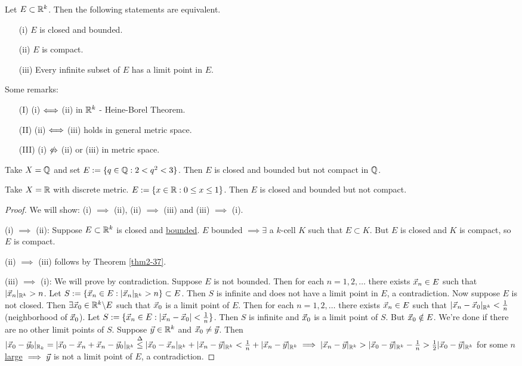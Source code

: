 \documentclass[]{article}
\begin{document}
\begin{theorem}
	Let \ul{$E\subset\mathbb{R}^k$}. Then the following statements are equivalent.
	\begin{enumerate}
		\item[(i)] $E$ is closed and bounded.
		\item[(ii)] $E$ is compact.
		\item[(iii)] Every infinite subset of $E$ has a limit point in $E$.
	\end{enumerate}
\end{theorem}
\begin{remark}
	Some remarks:
	\begin{enumerate}
		\item[(I)] (i) $\Longleftrightarrow$ (ii) in $\mathbb{R}^k$ - Heine-Borel Theorem.
		\item[(II)] (ii) $\Longleftrightarrow$ (iii) holds in general metric space.
		\item[(III)] (i) $\not\Leftrightarrow$ (ii) or (iii) in metric space.
	\end{enumerate}
\end{remark}
\begin{example}
	Take $X = \mathbb{Q}$ and set $E:=\{q\in\mathbb{Q}: 2<q^2<3\}$.
	Then $E$ is closed and bounded but not compact in $\mathbb{Q}$.
\end{example}
\begin{example}
	Take $X = \mathbb{R}$ with discrete metric.
	$E := \{x\in\mathbb{R} : 0\leq x\leq 1\}$. Then $E$ is closed and bounded but not compact.
\end{example}
\begin{proof}
	We will show: (i) $\implies$ (ii), (ii) $\implies$ (iii) and (iii) $\implies$ (i).

	(i) $\implies$ (ii): Suppose $E\subset\mathbb{R}^k$ is closed and \ul{bounded}.
	$E$ bounded $\implies \exists$ a $k$-cell $K$ such that $E\subset K$.
	But $E$ is closed and $K$ is compact, so $E$ is compact.

	(ii) $\implies$ (iii) follows by Theorem \ref{thm2-37}.

	(iii) $\implies$ (i): We will prove by contradiction.
	Suppose $E$ is not bounded.
	Then for each $n = 1,2,\dots$ there exists $\vec{x}_n\in E$ such that $|\vec{x}_n|_{\mathbb{R}^k}>n$.
	Let $S := \{\vec{x}_n\in E : |\vec{x}_n|_{\mathbb{R}^k} > n\}\subset E$.
	Then $S$ is infinite and does not have a limit point in $E$, a contradiction.
	Now suppose $E$ is not closed. Then $\exists \vec{x}_0\in\mathbb{R}^k\backslash E$ such that $\vec{x}_0$ is a limit point of $E$.
	Then for each $n = 1,2,\dots$ there exists $\vec{x}_n\in E$ such that $|\vec{x}_n-\vec{x}_0|_{\mathbb{R}^k} < \frac{1}{n}$ (neighborhood of $\vec{x}_0$).
	Let $S := \{\vec{x}_n\in E : |\vec{x}_n - \vec{x}_0|<\frac{1}{n}\}$. Then $S$ is infinite and $\vec{x}_0$ is a limit point of $S$. But $\vec{x}_0\notin E$.
	We're done if there are no other limit points of $S$.
	Suppose $\vec{y}\in\mathbb{R}^k$ and $\vec{x}_0\neq\vec{y}$. Then $|\vec{x}_0 - \vec{y}_0|_{\mathbb{R}_k} = |\vec{x}_0 - \vec{x}_n + \vec{x}_n - \vec{y}_0|_{\mathbb{R}^k} \overset{\Delta}{\leq} |\vec{x}_0 - \vec{x}_n|_{\mathbb{R}^k} + |\vec{x}_n - \vec{y}|_{\mathbb{R}^k} < \frac{1}{n} + |\vec{x}_n - \vec{y}|_{\mathbb{R}^k} \implies |\vec{x}_n - \vec{y}|_{\mathbb{R}^k} > |\vec{x}_0 - \vec{y}|_{\mathbb{R}^k} - \frac{1}{n} > \frac{1}{2} |\vec{x}_0-\vec{y}|_{\mathbb{R}^k}$ for some \ul{$n$ large} $\implies \vec{y}$ is not a limit point of $E$, a contradiction.
\end{proof}
\end{document}
